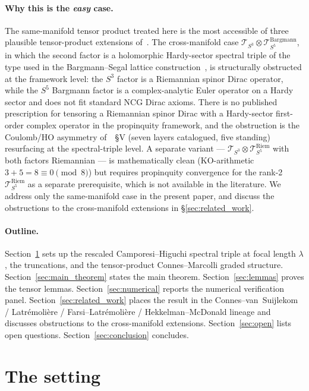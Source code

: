 \documentclass[11pt,a4paper]{article}
\theoremstyle{plain}
\theoremstyle{definition}
\newcommand{\sthree}{S^{3}}
\newcommand{\Tcal}{\mathcal{T}}
\begin{document}
\paragraph{Why this is the \emph{easy} case.}
The same-manifold tensor product treated here is the most accessible
of three plausible tensor-product extensions of~\cite{loutey_paper38}.
The cross-manifold case
$\Tcal_{\sthree} \otimes \Tcal_{S^5}^{\mathrm{Bargmann}}$, in which the
second factor is a holomorphic Hardy-sector spectral triple of the
type used in the Bargmann--Segal lattice
construction~\cite{paper24}, is structurally obstructed at the
framework level: the $\sthree$ factor is a Riemannian spinor Dirac
operator, while the $S^5$ Bargmann factor is a complex-analytic Euler
operator on a Hardy sector and does not fit
standard NCG Dirac axioms. There is no published prescription for
tensoring a Riemannian spinor Dirac with a Hardy-sector first-order
complex operator in the propinquity framework, and the obstruction is
the Coulomb/HO asymmetry of~\cite{paper24}~\S V (seven layers
catalogued, five standing) resurfacing at the spectral-triple level. A
separate variant ---
$\Tcal_{\sthree} \otimes \Tcal_{S^5}^{\mathrm{Riem}}$ with both factors
Riemannian --- is mathematically clean (KO-arithmetic $3+5=8\equiv
0\pmod 8$) but requires propinquity convergence for the rank-2
$\Tcal_{S^5}^{\mathrm{Riem}}$ as a separate prerequisite, which is not
available in the literature. We address only the same-manifold case in
the present paper, and discuss the obstructions to the cross-manifold
extensions in \S\ref{sec:related_work}.

\paragraph{Outline.}
Section~\ref{sec:setup} sets up the rescaled Camporesi--Higuchi
spectral triple at focal length $\lambda$, the truncations, and the
tensor-product Connes--Marcolli graded structure.
Section~\ref{sec:main_theorem} states the main theorem.
Section~\ref{sec:lemmas} proves the tensor lemmas.
Section~\ref{sec:numerical} reports the numerical verification panel.
Section~\ref{sec:related_work} places the result in the
Connes--van~Suijlekom / Latr\'emoli\`ere / Farsi--Latr\'emoli\`ere /
Hekkelman--McDonald lineage and discusses obstructions to the
cross-manifold extensions.
Section~\ref{sec:open} lists open questions.
Section~\ref{sec:conclusion} concludes.

\section{The setting}\label{sec:setup}
\end{document}
